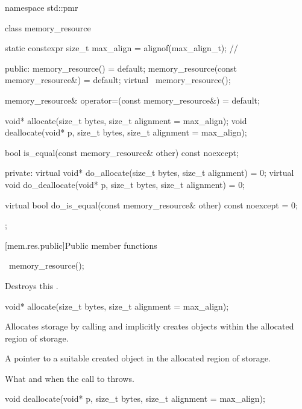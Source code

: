 %
%
\begin{codeblock}
namespace std::pmr {
  class memory_resource {
    static constexpr size_t max_align = alignof(max_align_t);   // \expos

  public:
    memory_resource() = default;
    memory_resource(const memory_resource&) = default;
    virtual ~memory_resource();

    memory_resource& operator=(const memory_resource&) = default;

    void* allocate(size_t bytes, size_t alignment = max_align);
    void deallocate(void* p, size_t bytes, size_t alignment = max_align);

    bool is_equal(const memory_resource& other) const noexcept;

  private:
    virtual void* do_allocate(size_t bytes, size_t alignment) = 0;
    virtual void do_deallocate(void* p, size_t bytes, size_t alignment) = 0;

    virtual bool do_is_equal(const memory_resource& other) const noexcept = 0;
  };
}
\end{codeblock}


[mem.res.public]{Public member functions}

%
\begin{itemdecl}
~memory_resource();
\end{itemdecl}

\begin{itemdescr}
\pnum
\effects
Destroys this .
\end{itemdescr}

%
\begin{itemdecl}
void* allocate(size_t bytes, size_t alignment = max_align);
\end{itemdecl}

\begin{itemdescr}
\pnum
\effects
Allocates storage by calling  and
implicitly creates objects within the allocated region of storage.

\pnum
\returns
A pointer to a suitable created object
in the allocated region of storage.

\pnum
\throws
What and when the call to  throws.
\end{itemdescr}

%
\begin{itemdecl}
void deallocate(void* p, size_t bytes, size_t alignment = max_align);
\end{itemdecl}

